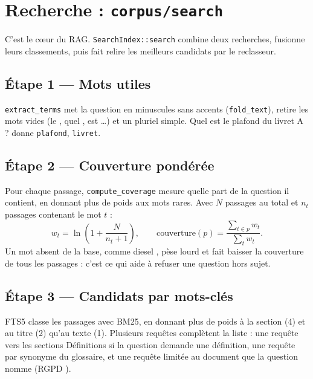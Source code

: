 \documentclass[11pt,a4paper]{article}
\newcommand{\fichier}[1]{\texttt{#1}}
\begin{document}
\section{Recherche : \texttt{corpus/search}}
\label{sec:search}

C'est le cœur du RAG. \texttt{SearchIndex::search} combine deux recherches, fusionne leurs classements, puis fait relire les meilleurs candidats par le reclasseur.

\subsection{Étape 1 --- Mots utiles}

\texttt{extract\_terms} met la question en minuscules sans accents (\texttt{fold\_text}), retire les mots vides (\og le \fg, \og quel \fg, \og est \fg\dots) et un pluriel simple. \og Quel est le plafond du livret A ? \fg{} donne \texttt{plafond}, \texttt{livret}.

\subsection{Étape 2 --- Couverture pondérée}

Pour chaque passage, \texttt{compute\_coverage} mesure quelle part de la question il contient, en donnant plus de poids aux mots rares. Avec \(N\) passages au total et \(n_t\) passages contenant le mot \(t\) :
\[
w_t = \ln\!\left(1 + \frac{N}{n_t + 1}\right), \qquad
\text{couverture}(p) = \frac{\sum_{t \in p} w_t}{\sum_{t} w_t}.
\]
Un mot absent de la base, comme \og diesel \fg, pèse lourd et fait baisser la couverture de tous les passages : c'est ce qui aide à refuser une question hors sujet.

\subsection{Étape 3 --- Candidats par mots-clés}

FTS5 classe les passages avec BM25, en donnant plus de poids à la section (4) et au titre (2) qu'au texte (1). Plusieurs requêtes complètent la liste : une requête vers les sections \og Définitions \fg{} si la question demande une définition, une requête par synonyme du glossaire, et une requête limitée au document que la question nomme (\og RGPD \fg).


\end{document}
